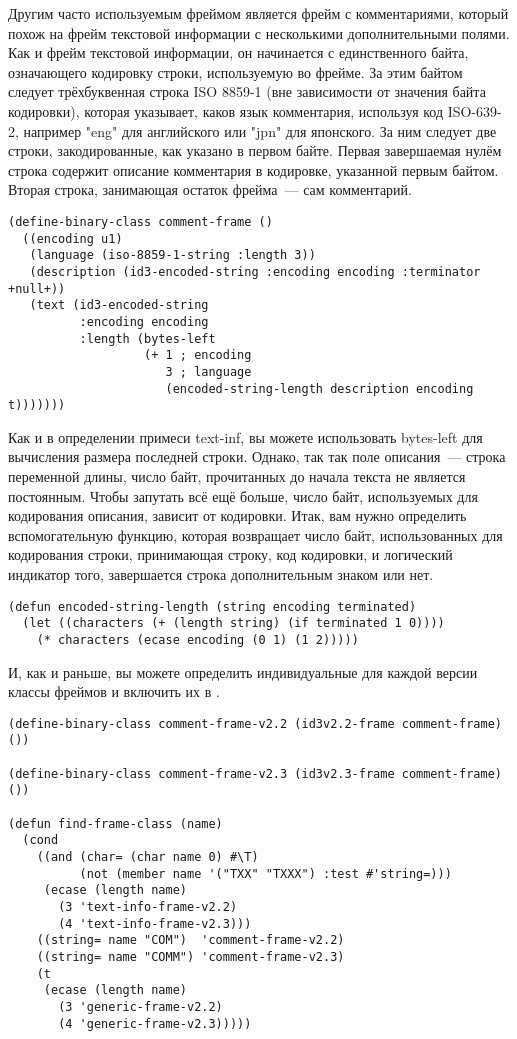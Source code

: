 Другим часто используемым фреймом является фрейм с комментариями, который похож на фрейм
текстовой информации с несколькими дополнительными полями. Как и фрейм текстовой
информации, он начинается с единственного байта, означающего кодировку строки,
используемую во фрейме. За этим байтом следует трёхбуквенная строка ISO 8859-1 (вне
зависимости от значения байта кодировки), которая указывает, каков язык комментария,
используя код ISO-639-2, например "eng" для английского или "jpn" для японского. За ним
следует две строки, закодированные, как указано в первом байте. Первая завершаемая нулём
строка содержит описание комментария в кодировке, указанной первым байтом. Вторая строка,
занимающая остаток фрейма~--- сам комментарий.

\begin{lstlisting}
(define-binary-class comment-frame ()
  ((encoding u1)
   (language (iso-8859-1-string :length 3))
   (description (id3-encoded-string :encoding encoding :terminator +null+))
   (text (id3-encoded-string
          :encoding encoding
          :length (bytes-left
                   (+ 1 ; encoding
                      3 ; language
                      (encoded-string-length description encoding t)))))))
\end{lstlisting}

Как и в определении примеси text-inf, вы можете использовать bytes-left для вычисления
размера последней строки. Однако, так так поле описания~--- строка переменной длины, число
байт, прочитанных до начала текста не является постоянным. Чтобы запутать всё ещё больше,
число байт, используемых для кодирования описания, зависит от кодировки. Итак, вам нужно
определить вспомогательную функцию, которая возвращает число байт, использованных для
кодирования строки, принимающая строку, код кодировки, и логический индикатор того,
завершается строка дополнительным знаком или нет.

\begin{lstlisting}
(defun encoded-string-length (string encoding terminated)
  (let ((characters (+ (length string) (if terminated 1 0))))
    (* characters (ecase encoding (0 1) (1 2)))))
\end{lstlisting}

И, как и раньше, вы можете определить индивидуальные для каждой версии классы фреймов и
включить их в .

\begin{lstlisting}
(define-binary-class comment-frame-v2.2 (id3v2.2-frame comment-frame) ())

(define-binary-class comment-frame-v2.3 (id3v2.3-frame comment-frame) ())

(defun find-frame-class (name)
  (cond
    ((and (char= (char name 0) #\T)
          (not (member name '("TXX" "TXXX") :test #'string=)))
     (ecase (length name)
       (3 'text-info-frame-v2.2)
       (4 'text-info-frame-v2.3)))
    ((string= name "COM")  'comment-frame-v2.2)
    ((string= name "COMM") 'comment-frame-v2.3)
    (t
     (ecase (length name)
       (3 'generic-frame-v2.2)
       (4 'generic-frame-v2.3)))))
\end{lstlisting}

